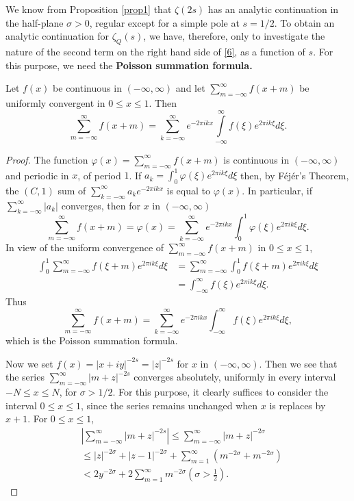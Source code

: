 We know from Proposition \ref{prop1} that $\zeta(2s)$ has an analytic
continuation in the half-plane $\sigma>0$, regular except for a simple
pole at $s=1/2$. To obtain an analytic continuation for
$\zeta_{Q}(s)$, we have, therefore, only to investigate the nature of
the second term on the right hand side of \eqref{6}, as a function of
$s$. For this purpose, we need the {\bf Poisson summation formula.}

\begin{proposition}\label{prop2}
Let $f(x)$ be continuous in $(-\infty,\infty)$ and let
$\sum\limits^{\infty}_{m=-\infty}f(x+m)$ be uniformly convergent in
$0\leq x\leq 1$. Then 
$$
\sum^{\infty}_{m=-\infty}f(x+m)=\sum^{\infty}_{k=-\infty}e^{-2\pi
  ikx}\int\limits^{\infty}_{-\infty}f(\xi)e^{2\pi ik\xi}d\xi.
$$\pageoriginale
\end{proposition}

\begin{proof}
The function $\varphi(x)=\sum\limits^{\infty}_{m=-\infty}f(x+m)$ is
continuous in $(-\infty,\infty)$ and periodic in $x$, of period
$1$. If $a_{k}=\int^{1}_{0}\varphi(\xi)e^{2\pi ik\xi}d\xi$ then, by
F\'ej\'er's Theorem, the $(C,1)$ sum of
$\sum\limits^{\infty}_{k=-\infty}a_{k}e^{-2\pi ikx}$ is equal to
$\varphi(x)$. In particular, if
$\sum\limits^{\infty}_{k=-\infty}|a_{k}|$ converges, then for $x$ in
$(-\infty,\infty)$ 
$$
\sum^{\infty}_{m=-\infty}f(x+m)=\varphi(x)=\sum^{\infty}_{k=-\infty}e^{-2\pi
  ikx}\int^{1}_{0}\varphi(\xi)e^{2\pi ik\xi}d\xi. 
$$
In view of the uniform convergence of
$\sum\limits^{\infty}_{m=-\infty}f(x+m)$ in $0\leq x\leq 1$,
\begin{align*}
\int^{1}_{0}\sum^{\infty}_{m=-\infty}f(\xi+m)e^{2\pi ik\xi}d\xi &=
\sum^{\infty}_{m=-\infty}\int^{1}_{0}f(\xi+m)e^{2\pi ik\xi}d\xi\\
&= \int^{\infty}_{-\infty}f(\xi)e^{2\pi ik\xi}d\xi.
\end{align*}
Thus
\begin{equation*}
\sum^{\infty}_{m=-\infty}f(x+m)=\sum^{\infty}_{k=-\infty}e^{-2\pi
  ikx}\int^{\infty}_{-\infty}f(\xi)e^{2\pi ik\xi}d\xi,\tag{7}\label{7}
\end{equation*}
which is the Poisson summation formula.

Now we set $f(x)=|x+iy|^{-2s}=|z|^{-2s}$ for $x$ in
$(-\infty,\infty)$. Then we see that the series
$\sum\limits^{\infty}_{m=-\infty}|m+z|^{-2s}$ converges absolutely,
uniformly in every interval $-N\leq x\leq N$, for $\sigma>1/2$. For
this purpose, it clearly suffices to consider the interval $0\leq
x\leq 1$, since the series remains unchanged when $x$ is replaces by
$x+1$. For $0\leq x\leq 1$,
\begin{align*}
&\left| \sum^{\infty}_{m=-\infty}|m+z|^{-2s}\right|\leq
  \sum^{\infty}_{m=-\infty}|m+z|^{-2\sigma}\\
&\leq
  |z|^{-2\sigma}+|z-1|^{-2\sigma}+\sum^{\infty}_{m=1}(m^{-2\sigma}+m^{-2\sigma})
  \\
&<2y^{-2\sigma}+2\sum^{\infty}_{m=1}m^{-2\sigma}\left(\sigma>\frac{1}{2}\right).
\end{align*}\pageoriginale
\end{proof}

